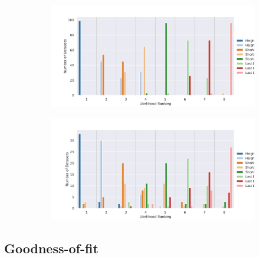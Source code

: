 \documentclass[10pt,letterpaper]{article}
\begin{document}
\begin{figure}[h!]
	\begin{subfigure}[b]{0.45\textwidth}
		\centering
		\includegraphics[width=\textwidth]{figures/yule-400-ccd1-likelihood-ranking.png}
	\end{subfigure}
	\begin{subfigure}[b]{0.45\textwidth}
		\centering
		\includegraphics[width=\textwidth]{figures/bio-ccd1-likelihood-ranking.png}
	\end{subfigure}
	
	\label{fig:data-likelihood-ranking}
\end{figure}

\subsection*{Goodness-of-fit}
\end{document}
